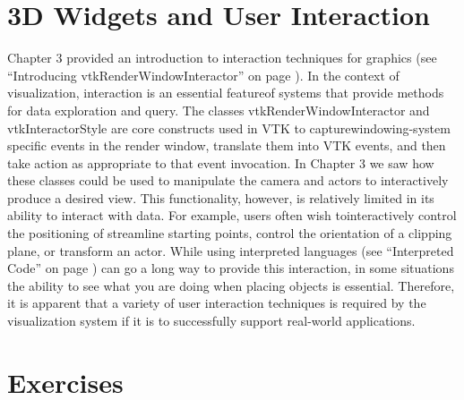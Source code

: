 \section{3D Widgets and User Interaction}
\label{sec:3dwui}
Chapter 3 provided an introduction to interaction techniques for graphics (see ``Introducing vtkRenderWindowInteractor'' on page \pageref{pg:rwi} ).
In the context of visualization, interaction is an essential featureof systems that provide methods for data exploration and query. The classes
vtkRenderWindowInteractor and vtkInteractorStyle are core constructs used in VTK to capturewindowing-system specific events in the render window, translate them into VTK events, and then take action as appropriate to that event invocation.
In Chapter 3 we saw how these classes could be used to manipulate the camera and actors to interactively produce a desired view. This functionality,
however, is relatively limited in its ability to interact with data. For example, users often wish tointeractively control the positioning of streamline starting points, control the orientation of a clipping plane, or transform an actor. While using interpreted languages (see ``Interpreted Code'' on page \pageref{pg:rwi} ) can go a long way to provide this interaction, in some situations the ability to see what you are doing when placing objects is essential. Therefore, it is apparent that a variety of user interaction techniques is required by the visualization system if it is to successfully support real-world applications.



\section{Exercises}
	